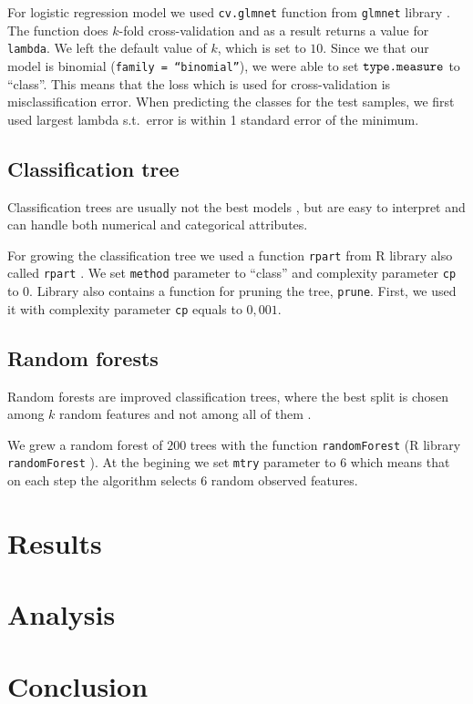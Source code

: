 \documentclass[a4paper,11pt]{article}
\begin{document}
For logistic regression model we used \verb|cv.glmnet| function from \verb|glmnet| library \cite{glmnet}. The function does $k$-fold cross-validation and as a result returns a value for \verb|lambda|. We left the default value of $k$, which is set to $10$. Since we that our model is binomial (\verb|family = “binomial”|), we were able to set $\verb|type.measure|$ to “class”. This means that the loss which is used for cross-validation is misclassification error. When predicting the classes for the test samples, we first used largest lambda s.t.\ error is within 1 standard error of the minimum.

\subsection{Classification tree}
\label{subsec: classificationtree}
Classification trees are usually not the best models \cite{classificationTrees}, but are easy to interpret and can handle both numerical and categorical attributes. 

For growing the classification tree we used a function \verb|rpart| from R library also called \verb|rpart| \cite{rpart}. We set \verb|method| parameter to “class” and complexity parameter \verb|cp| to $0$. Library also contains a function for pruning the tree, \verb|prune|. First, we used it with complexity parameter \verb|cp| equals to $0{,}001$.


\subsection{Random forests}
\label{subsec: randomforests}
Random forests are improved classification trees, where the best split is chosen among $k$ random features and not among all of them \cite{randomForestsL}. 

We grew a random forest of $200$ trees with the function \verb|randomForest| (R library \verb|randomForest| \cite{randomForestsL}). At the begining we set \verb|mtry| parameter to $6$ which means that on each step the algorithm selects $6$ random observed features.

\section{Results}
\label{sec: results}

\section{Analysis}
\label{sec: analysis}

\section{Conclusion}



\end{document}
